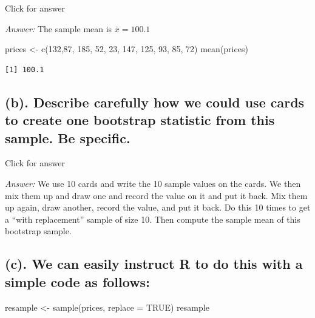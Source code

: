 \documentclass[
]{book}
\newenvironment{Shaded}{\begin{snugshade}}{\end{snugshade}}
\newcommand{\AttributeTok}[1]{\textcolor[rgb]{0.77,0.63,0.00}{#1}}
\newcommand{\ConstantTok}[1]{\textcolor[rgb]{0.00,0.00,0.00}{#1}}
\newcommand{\DecValTok}[1]{\textcolor[rgb]{0.00,0.00,0.81}{#1}}
\newcommand{\FunctionTok}[1]{\textcolor[rgb]{0.00,0.00,0.00}{#1}}
\newcommand{\NormalTok}[1]{#1}
\newcommand{\OtherTok}[1]{\textcolor[rgb]{0.56,0.35,0.01}{#1}}
\begin{document}
Click for answer

\emph{Answer:} The sample mean is \(\bar{x} = 100.1\)

\begin{Shaded}
\begin{Highlighting}[]
\NormalTok{prices }\OtherTok{\textless{}{-}} \FunctionTok{c}\NormalTok{(}\DecValTok{132}\NormalTok{,}\DecValTok{87}\NormalTok{, }\DecValTok{185}\NormalTok{, }\DecValTok{52}\NormalTok{, }\DecValTok{23}\NormalTok{, }\DecValTok{147}\NormalTok{, }\DecValTok{125}\NormalTok{, }\DecValTok{93}\NormalTok{, }\DecValTok{85}\NormalTok{, }\DecValTok{72}\NormalTok{)}
\FunctionTok{mean}\NormalTok{(prices)}
\end{Highlighting}
\end{Shaded}

\begin{verbatim}
[1] 100.1
\end{verbatim}

\hypertarget{b.-describe-carefully-how-we-could-use-cards-to-create-one-bootstrap-statistic-from-this-sample.-be-specific.}{%
\subsection{(b). Describe carefully how we could use cards to create one bootstrap statistic from this sample. Be specific.}\label{b.-describe-carefully-how-we-could-use-cards-to-create-one-bootstrap-statistic-from-this-sample.-be-specific.}}

Click for answer

\emph{Answer:} We use 10 cards and write the 10 sample values on the cards. We then mix them up and draw one and record the value on it and put it back. Mix them up again, draw another, record the value, and put it back. Do this 10 times to get a ``with replacement'' sample of size 10. Then compute the sample mean of this bootstrap sample.

\hypertarget{c.-we-can-easily-instruct-r-to-do-this-with-a-simple-code-as-follows}{%
\subsection{(c). We can easily instruct R to do this with a simple code as follows:}\label{c.-we-can-easily-instruct-r-to-do-this-with-a-simple-code-as-follows}}

\begin{Shaded}
\begin{Highlighting}[]
\NormalTok{resample }\OtherTok{\textless{}{-}} \FunctionTok{sample}\NormalTok{(prices, }\AttributeTok{replace =} \ConstantTok{TRUE}\NormalTok{)}
\NormalTok{resample}
\end{Highlighting}
\end{Shaded}
\end{document}
